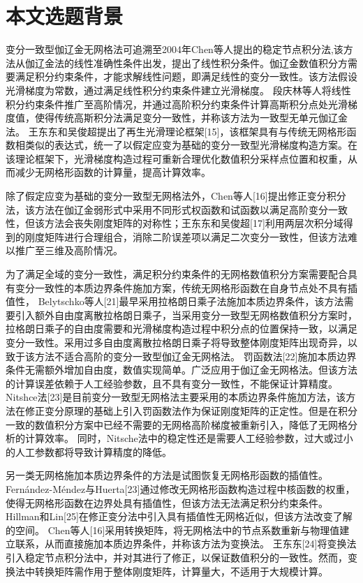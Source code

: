 \section{本文选题背景}
变分一致型伽辽金无网格法可追溯至2004年Chen等人提出的稳定节点积分法,该方法从伽辽金法的线性准确性条件出发，提出了线性积分条件。伽辽金数值积分方需要满足积分约束条件，才能求解线性问题，即满足线性的变分一致性。该方法假设光滑梯度为常数，通过满足线性积分约束条件建立光滑梯度。
段庆林等人将线性积分约束条件推广至高阶情况，并通过高阶积分约束条件计算高斯积分点处光滑梯度值，使得传统高斯积分法满足变分一致性，并称该方法为一致型无单元伽辽金法。
王东东和吴俊超提出了再生光滑理论框架[15]，该框架具有与传统无网格形函数相类似的表达式，统一了以假定应变为基础的变分一致型光滑梯度构造方案。在该理论框架下，光滑梯度构造过程可重新合理优化数值积分采样点位置和权重，从而减少无网格形函数的计算量，提高计算效率。
\par
除了假定应变为基础的变分一致型无网格法外，Chen等人[16]提出修正变分积分法，该方法在伽辽金弱形式中采用不同形式权函数和试函数以满足高阶变分一致性，但该方法会丧失刚度矩阵的对称性；王东东和吴俊超[17]利用两层次积分域得到的刚度矩阵进行合理组合，消除二阶误差项以满足二次变分一致性，但该方法难以推广至三维及高阶情况。\par
为了满足全域的变分一致性，满足积分约束条件的无网格数值积分方案需要配合具有变分一致性的本质边界条件施加方案，传统无网格形函数在自身节点处不具有插值性，
Belytschko等人[21]最早采用拉格朗日乘子法施加本质边界条件，该方法需要引入额外自由度离散拉格朗日乘子，当采用变分一致型无网格数值积分方案时，拉格朗日乘子的自由度需要和光滑梯度构造过程中积分点的位置保持一致，以满足变分一致性。采用过多自由度离散拉格朗日乘子将导致整体刚度矩阵出现奇异，以致于该方法不适合高阶的变分一致型伽辽金无网格法。
罚函数法[22]施加本质边界条件无需额外增加自由度，数值实现简单。广泛应用于伽辽金无网格法。但该方法的计算误差依赖于人工经验参数，且不具有变分一致性，不能保证计算精度。
Nitshce法[23]是目前变分一致型无网格法主要采用的本质边界条件施加方法，该方法在修正变分原理的基础上引入罚函数法作为保证刚度矩阵的正定性。但是在积分一致的数值积分方案中已经不需要的无网格高阶梯度被重新引入，降低了无网格分析的计算效率。
同时，Nitsche法中的稳定性还是需要人工经验参数，过大或过小的人工参数都将导致计算精度的降低。
\par
另一类无网格施加本质边界条件的方法是试图恢复无网格形函数的插值性。
Fernández-Méndez与Huerta[23]通过修改无网格形函数构造过程中核函数的权重，使得无网格形函数在边界处具有插值性，但该方法无法满足积分约束条件。Hillman和Lin[25]在修正变分法中引入具有插值性无网格近似，但该方法改变了解的空间。
Chen等人[16]采用转换矩阵，将无网格法中的节点系数重新与物理值建立联系，从而直接施加本质边界条件，并称该方法为变换法。
王东东[24]将变换法引入稳定节点积分法中，并对其进行了修正，以保证数值积分的一致性。然而，变换法中转换矩阵需作用于整体刚度矩阵，计算量大，不适用于大规模计算。
